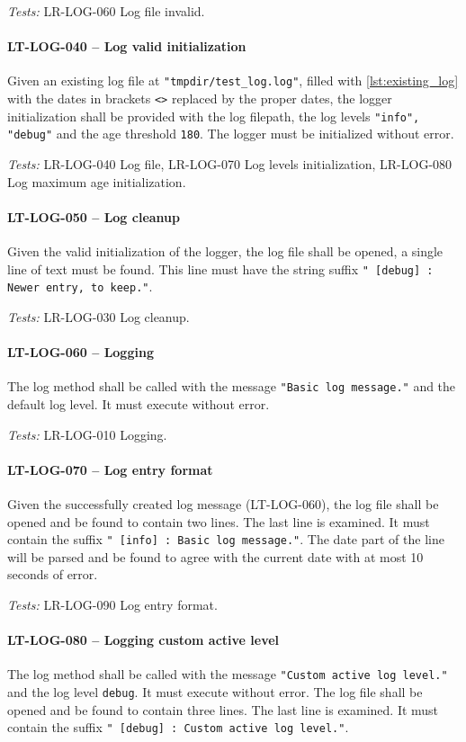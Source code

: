 \textit{Tests: } LR-LOG-060 Log file invalid.

\paragraph{LT-LOG-040 -- Log valid initialization}
Given an existing log file at \lstinline{"tmpdir/test_log.log"},
filled with \cref{lst:existing_log} with the dates in brackets \lstinline{<>}
replaced by the proper dates, the logger initialization shall be
provided with the log filepath, the log levels \lstinline{"info", "debug"}
and the age threshold \lstinline{180}.
The logger must be initialized without error.

\textit{Tests: } LR-LOG-040 Log file, LR-LOG-070 Log levels initialization,
                 LR-LOG-080 Log maximum age initialization.

\paragraph{LT-LOG-050 -- Log cleanup}
Given the valid initialization of the logger, the log file
shall be opened, a single line of text must be found.
This line must have the string suffix
\lstinline{" [debug] : Newer entry, to keep."}.

\textit{Tests: } LR-LOG-030 Log cleanup.

\paragraph{LT-LOG-060 -- Logging}
The log method shall be called with the message
\lstinline{"Basic log message."} and the default log level.
It must execute without error.

\textit{Tests: } LR-LOG-010 Logging.

\paragraph{LT-LOG-070 -- Log entry format}
Given the successfully created log message (LT-LOG-060),
the log file shall be opened and be found to contain two lines.
The last line is examined. It must contain the suffix
\lstinline{" [info] : Basic log message."}.
The date part of the line will be parsed and be found to agree
with the current date with at most 10 seconds of error.

\textit{Tests: } LR-LOG-090 Log entry format.

\paragraph{LT-LOG-080 -- Logging custom active level}
The log method shall be called with the message
\lstinline{"Custom active log level."} and the log level
\lstinline{debug}. It must execute without error.
The log file shall be opened and be found to contain three lines.
The last line is examined. It must contain the suffix
\lstinline{" [debug] : Custom active log level."}.

